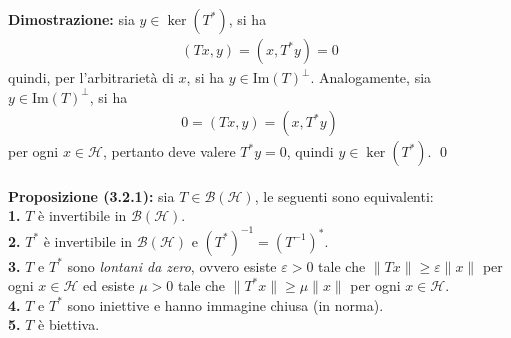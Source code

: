 \documentclass{article}
\numberwithin{equation}{subsection}
\begin{document}
\textbf{Dimostrazione:} sia $y \in \ker(T^*)$, si ha 
\begin{align*}
    (Tx, y) = (x, T^*y) = 0 
\end{align*}
quindi, per l'arbitrarietà di $x$, si ha $y \in \mathrm{Im}(T)^\perp$. Analogamente, sia $y \in \mathrm{Im}(T)^\perp$, si ha 
\begin{align*}
    0 = (Tx, y) = (x, T^*y) 
\end{align*}
per ogni $x \in \mathcal{H}$, pertanto deve valere $T^*y = 0$, quindi $y \in \ker(T^*)$. \qed \\ \\
\textbf{Proposizione (3.2.1):} sia $T \in \mathcal{B}(\mathcal{H})$, le seguenti sono equivalenti: \\
\textbf{1.} $T$ è invertibile in $\mathcal{B}(\mathcal{H})$. \\
\textbf{2.} $T^*$ è invertibile in $\mathcal{B}(\mathcal{H})$ e $(T^*)^{-1} = (T^{-1})^*$. \\
\textbf{3.} $T$ e $T^*$ sono \textit{lontani da zero}, ovvero esiste $\varepsilon > 0$ tale che $\|Tx\| \geq \varepsilon\|x\|$ per ogni $x \in \mathcal{H}$ ed esiste $\mu > 0$ tale che $\|T^*x\| \geq \mu\|x\|$ per ogni $x \in \mathcal{H}$. \\
\textbf{4.} $T$ e $T^*$ sono iniettive e hanno immagine chiusa (in norma). \\
\textbf{5.} $T$ è biettiva. \\
\end{document}
